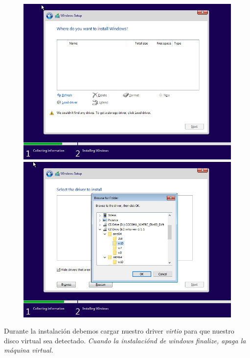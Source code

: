 \documentclass[12pt]{article}
\begin{document}
\begin{figure}[h!]
	\centering
	\begin{minipage}[b]{0.4965\textwidth}
		\includegraphics[width=\textwidth]{images/windows-setup-01.png}
	\end{minipage}
	\begin{minipage}[b]{0.4965\textwidth}
		\includegraphics[width=\textwidth]{images/windows-setup-02.png}
	\end{minipage}
\end{figure}

Durante la instalación debemos cargar nuestro driver \emph{virtio} para que nuestro disco virtual sea detectado. \emph{Cuando la instalaciónd de windows finalize, apaga la máquina virtual.}
\end{document}
